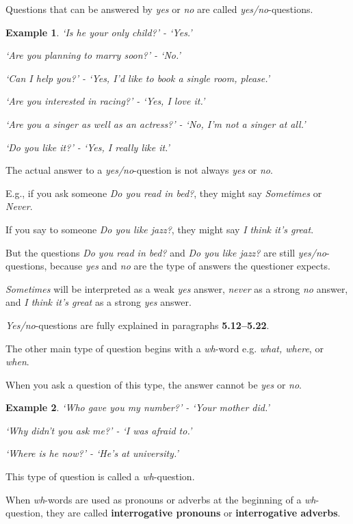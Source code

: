 \documentclass[oneside]{book}
\numberwithin{equation}{section}
\newtheorem{example}{Example}[section]
\begin{document}
%
Questions that can be answered by \textit{yes} or \textit{no} are called \textit{yes/no}-questions.
\begin{example}
    `Is he your only child?' - `Yes.'
    
    `Are you planning to marry soon?' - `No.'
    
    `Can I help you?' - `Yes, I'd like to book a single room, please.'
    
    `Are you interested in racing?' - `Yes, I love it.'
    
    `Are you a singer as well as an actress?' - `No, I'm not a singer at all.'
    
    `Do you like it?' - `Yes, I really like it.'
\end{example}
The actual answer to a \textit{yes/no}-question is not always \textit{yes} or \textit{no}.

E.g., if you ask someone \textit{Do you read in bed?}, they might say \textit{Sometimes} or \textit{Never}.

If you say to someone \textit{Do you like jazz?}, they might say \textit{I think it's great}.

But the questions \textit{Do you read in bed?} and \textit{Do you like jazz?} are still \textit{yes/no}-questions, because \textit{yes} and \textit{no} are the type of answers the questioner expects.

\textit{Sometimes} will be interpreted as a weak \textit{yes} answer, \textit{never} as a strong \textit{no} answer, and \textit{I think it's great} as a strong \textit{yes} answer.

%
\textit{Yes/no}-questions are fully explained in paragraphs \textbf{5.12--5.22}.

%
The other main type of question begins with a \textit{wh}-word e.g. \textit{what, where}, or \textit{when}.

When you ask a question of this type, the answer cannot be \textit{yes} or \textit{no}.
\begin{example}
    `Who gave you my number?' - `Your mother did.'
    
    `Why didn't you ask me?' - `I was afraid to.'
    
    `Where is he now?' - `He's at university.'
\end{example}
This type of question is called a \textit{wh}-question.

When \textit{wh}-words are used as pronouns or adverbs at the beginning of a \textit{wh}-question, they are called \textbf{interrogative pronouns} or \textbf{interrogative adverbs}.
\end{document}
